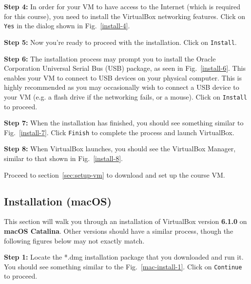 \documentclass[11pt]{article}
\begin{document}
\textbf{Step 4:} In order for your VM to have access to the Internet (which is required for this course), you need to install the VirtualBox networking features. Click on \texttt{Yes} in the dialog shown in Fig.~\ref{install-4}.


\textbf{Step 5:} Now you're ready to proceed with the installation. Click on \texttt{Install}.

\textbf{Step 6:} The installation process may prompt you to install the Oracle Corporation Universal Serial Bus (USB) package, as seen in Fig.~\ref{install-6}. This enables your VM to connect to USB devices on your physical computer. This is highly recommended as you may occasionally wish to connect a USB device to your VM (e.g. a flash drive if the networking fails, or a mouse). Click on \texttt{Install} to proceed.

\textbf{Step 7:} When the installation has finished, you should see something similar to Fig.~\ref{install-7}. Click \texttt{Finish} to complete the process and launch VirtualBox.

\textbf{Step 8:} When VirtualBox launches, you should see the VirtualBox Manager, similar to that shown in Fig.~\ref{install-8}.

Proceed to section~\ref{sec:setup-vm} to download and set up the course VM.


\subsection{Installation (macOS)}
\label{subsec:install-osx}
This section will walk you through an installation of VirtualBox version \textbf{6.1.0} on \textbf{macOS Catalina}. Other versions should have a similar process, though the following figures below may not exactly match.

\textbf{Step 1:} Locate the *.dmg installation package that you downloaded and run it. You should see something similar to the Fig.~\ref{mac-install-1}. Click on \texttt{Continue} to proceed.
\end{document}
